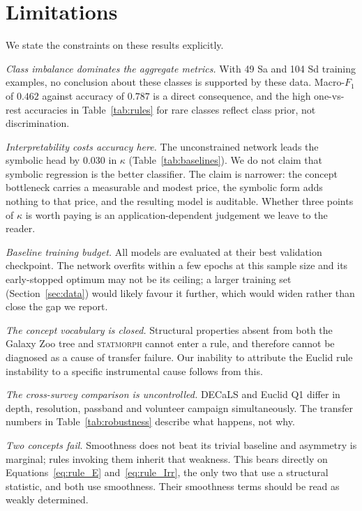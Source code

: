 \documentclass[11pt]{article}
\begin{document}
\section{Limitations}
\label{sec:limitations}

We state the constraints on these results explicitly.

\emph{Class imbalance dominates the aggregate metrics.} With 49 Sa and 104 Sd
training examples, no conclusion about these classes is supported by these
data. Macro-$F_1$ of $0.462$ against accuracy of $0.787$ is a direct
consequence, and the high one-vs-rest accuracies in
Table~\ref{tab:rules} for rare classes reflect class prior, not discrimination.

\emph{Interpretability costs accuracy here.} The unconstrained network leads
the symbolic head by $0.030$ in $\kappa$ (Table~\ref{tab:baselines}). We do not
claim that symbolic regression is the better classifier. The claim is narrower:
the concept bottleneck carries a measurable and modest price, the symbolic form
adds nothing to that price, and the resulting model is auditable. Whether three
points of $\kappa$ is worth paying is an application-dependent judgement we
leave to the reader.

\emph{Baseline training budget.} All models are evaluated at their best
validation checkpoint. The network overfits within a few epochs at this sample
size and its early-stopped optimum may not be its ceiling; a larger training
set (Section~\ref{sec:data}) would likely favour it further, which would widen
rather than close the gap we report.

\emph{The concept vocabulary is closed.} Structural properties absent from
both the Galaxy Zoo tree and \textsc{statmorph} cannot enter a rule, and
therefore cannot be diagnosed as a cause of transfer failure. Our inability to
attribute the Euclid rule instability to a specific instrumental cause follows
from this.

\emph{The cross-survey comparison is uncontrolled.} DECaLS and Euclid Q1
differ in depth, resolution, passband and volunteer campaign simultaneously.
The transfer numbers in Table~\ref{tab:robustness} describe what happens, not
why.

\emph{Two concepts fail.} Smoothness does not beat its trivial baseline and
asymmetry is marginal; rules invoking them inherit that weakness. This bears
directly on Equations~\eqref{eq:rule_E} and~\eqref{eq:rule_Irr}, the only two
that use a structural statistic, and both use smoothness. Their smoothness
terms should be read as weakly determined.
\end{document}
